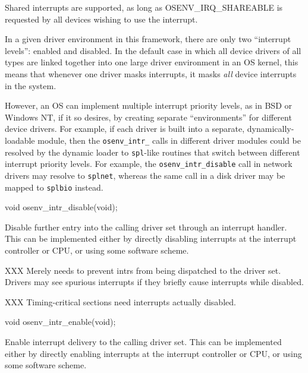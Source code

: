 
Shared interrupts are supported, as long as OSENV_IRQ_SHAREABLE 
is requested by all devices wishing to use the interrupt.

In a given driver environment in this framework,
there are only two ``interrupt levels'': enabled and disabled.
In the default case in which all device drivers of all types
are linked together into one large driver environment in an OS kernel,
this means that whenever one driver masks interrupts,
it masks \emph{all} device interrupts in the system.

However, an OS can implement multiple interrupt priority levels,
as in BSD or Windows NT, if it so desires,
by creating separate ``environments'' for different device drivers.
For example, if each driver
is built into a separate, dynamically-loadable module,
then the {\tt osenv_intr_} calls in different driver modules
could be resolved by the dynamic loader to {\tt spl}-like routines
that switch between different interrupt priority levels.
For example, the {\tt osenv_intr_disable} call in network drivers
may resolve to {\tt splnet},
whereas the same call in a disk driver may be mapped to {\tt splbio} instead.


\label{osenv-intr-disable}
\begin{apisyn}
	\funcproto void osenv_intr_disable(void);
\end{apisyn}
\drvtoosn
\begin{apidesc}
	Disable further entry into the calling driver set through an
	interrupt handler.  This can be implemented either by directly
	disabling interrupts at the interrupt controller or CPU, or
	using some software scheme.

	XXX Merely needs to prevent intrs from being dispatched 
	to the driver set.  Drivers may see spurious interrupts
	if they briefly cause interrupts while disabled.

	XXX Timing-critical sections need interrupts actually disabled.
\end{apidesc}


\begin{apisyn}
	\funcproto void osenv_intr_enable(void);
\end{apisyn}
\drvtoosn
\begin{apidesc}
	Enable interrupt delivery to the calling driver set.
	This can be implemented either by directly enabling interrupts
	at the interrupt controller or CPU, or using some software scheme.
\end{apidesc}


